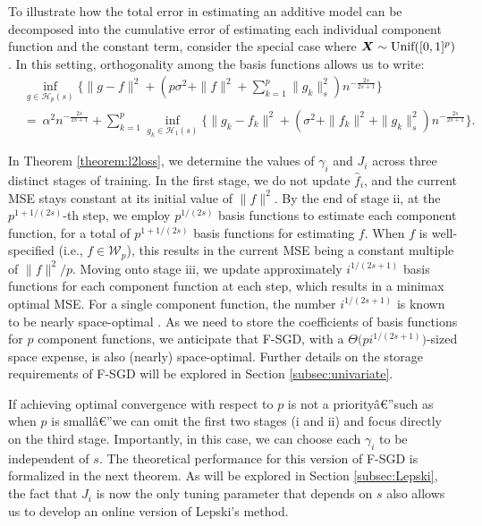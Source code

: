 \begin{remark}
To illustrate how the total error in estimating an additive model can be decomposed into the cumulative error of estimating each individual component function and the constant term, consider the special case where $\bm{X} \sim \text{Unif}([0,1]^p)$. In this setting, orthogonality among the basis functions allows us to write:
\begin{align*}
    &\inf_{g\in \mathcal{H}_p(s)} \Bigg\{ \|g-f\|^2 + \left(p\sigma^2+\|f\|^2+\sum_{k=1}^p\|g_k\|^2_s \right) n^{-\frac{2s}{2s+1}}\Bigg\}\\
    &=~ \alpha^2n^{-\frac{2s}{2s+1}}+\sum_{k=1}^p\inf_{g_k\in \mathcal{H}_1(s)} \Bigg\{ \|g_k-f_k\|^2 + \left(\sigma^2+\|f_k\|^2+\|g_k\|^2_s \right) n^{-\frac{2s}{2s+1}}\Bigg\}.
\end{align*}
\end{remark}
\begin{remark}
In Theorem \ref{theorem:l2loss}, we determine the values of $\gamma_i$ and $J_i$ across three distinct stages of training. In the first stage, we do not update $\hat f_i$, and the current MSE stays constant at  its initial value of $\|f\|^2$. By the end of stage ii, at the $p^{1+1/(2s)}$-th step, we employ $p^{1/(2s)}$ basis functions to estimate each component function, for a total of $p^{1+1/(2s)}$ basis functions for estimating $f$. When $f$ is well-specified (i.e., $f \in \mathcal{W}_p$), this results in the current MSE being a constant multiple of $\|f\|^2/p$. Moving onto stage iii, we update approximately $i^{1/(2s+1)}$ basis functions for each component function at each step, which results in a minimax optimal MSE. For a single component function, the number $i^{1/(2s+1)}$ is known to be nearly space-optimal \citep{zhang2022sieve,quan2024optimal}. As we need to store the coefficients of basis functions for $p$ component functions, we anticipate that F-SGD, with a  $\Theta\big(pi^{1/(2s+1)}\big)$-sized space expense, is also (nearly) space-optimal. Further details on the storage requirements of F-SGD will be explored in Section \ref{subsec:univariate}.
\end{remark}

If achieving optimal convergence with respect to $ p $ is not a priorityâ€”such as when $ p $ is smallâ€”we can omit the first two stages (i and ii) and focus directly on the third stage. Importantly, in this case, we can choose each $\gamma_i$ to be independent of $s$. The theoretical performance for this version of F-SGD is formalized in the next theorem. As will be explored in Section \ref{subsec:Lepski}, the fact that $J_i$ is now the only tuning parameter that depends on $ s $ also allows us to develop an online version of Lepski's method.

